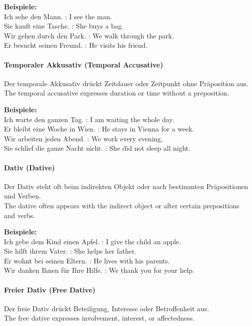 \documentclass[a4paper]{article}
\begin{document}
            \textbf{Beispiele:}\\
            Ich sehe den Mann. : I see the man.\\
            Sie kauft eine Tasche. : She buys a bag.\\
            Wir gehen durch den Park. : We walk through the park.\\
            Er besucht seinen Freund. : He visits his friend.
        
        \paragraph{Temporaler Akkusativ {\small (Temporal Accusative)}}
            Der temporale Akkusativ drückt Zeitdauer oder Zeitpunkt ohne Präposition aus.\\
            The temporal accusative expresses duration or time without a preposition.
            
            \textbf{Beispiele:}\\
            Ich warte den ganzen Tag. : I am waiting the whole day.\\
            Er bleibt eine Woche in Wien. : He stays in Vienna for a week.\\
            Wir arbeiten jeden Abend. : We work every evening.\\
            Sie schlief die ganze Nacht nicht. : She did not sleep all night.
        
        \paragraph{Dativ {\small (Dative)}}
            Der Dativ steht oft beim indirekten Objekt oder nach bestimmten Präpositionen und Verben.\\
            The dative often appears with the indirect object or after certain prepositions and verbs.
            
            \textbf{Beispiele:}\\
            Ich gebe dem Kind einen Apfel. : I give the child an apple.\\
            Sie hilft ihrem Vater. : She helps her father.\\
            Er wohnt bei seinen Eltern. : He lives with his parents.\\
            Wir danken Ihnen für Ihre Hilfe. : We thank you for your help.
        
        \paragraph{Freier Dativ {\small (Free Dative)}}
            Der freie Dativ drückt Beteiligung, Interesse oder Betroffenheit aus.\\
            The free dative expresses involvement, interest, or affectedness.
            
\end{document}
